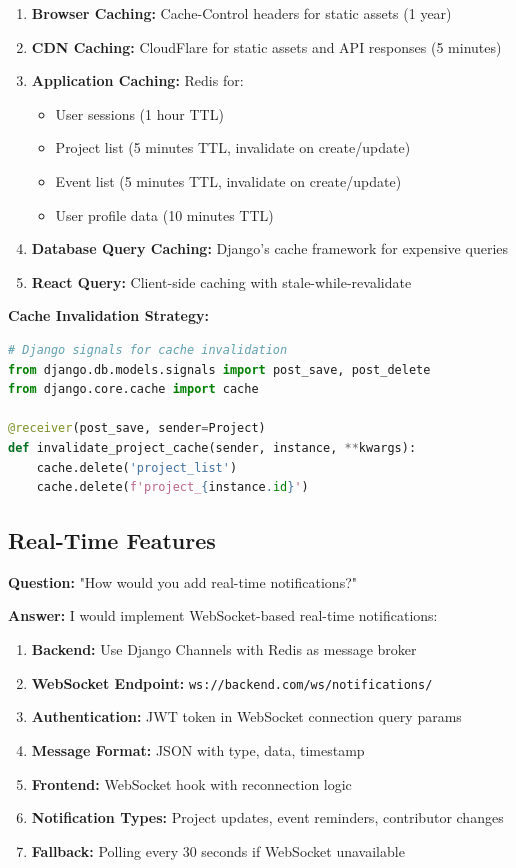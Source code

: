 \documentclass[11pt,a4paper]{article}
\begin{document}
\begin{enumerate}[leftmargin=*]
    \item \textbf{Browser Caching:} Cache-Control headers for static assets (1 year)
    \item \textbf{CDN Caching:} CloudFlare for static assets and API responses (5 minutes)
    \item \textbf{Application Caching:} Redis for:
    \begin{itemize}
        \item User sessions (1 hour TTL)
        \item Project list (5 minutes TTL, invalidate on create/update)
        \item Event list (5 minutes TTL, invalidate on create/update)
        \item User profile data (10 minutes TTL)
    \end{itemize}
    \item \textbf{Database Query Caching:} Django's cache framework for expensive queries
    \item \textbf{React Query:} Client-side caching with stale-while-revalidate
\end{enumerate}

\textbf{Cache Invalidation Strategy:}
\begin{lstlisting}[language=Python]
# Django signals for cache invalidation
from django.db.models.signals import post_save, post_delete
from django.core.cache import cache

@receiver(post_save, sender=Project)
def invalidate_project_cache(sender, instance, **kwargs):
    cache.delete('project_list')
    cache.delete(f'project_{instance.id}')
\end{lstlisting}

\subsection{Real-Time Features}
\textbf{Question:} "How would you add real-time notifications?"

\textbf{Answer:} I would implement WebSocket-based real-time notifications:

\begin{enumerate}[leftmargin=*]
    \item \textbf{Backend:} Use Django Channels with Redis as message broker
    \item \textbf{WebSocket Endpoint:} \texttt{ws://backend.com/ws/notifications/}
    \item \textbf{Authentication:} JWT token in WebSocket connection query params
    \item \textbf{Message Format:} JSON with type, data, timestamp
    \item \textbf{Frontend:} WebSocket hook with reconnection logic
    \item \textbf{Notification Types:} Project updates, event reminders, contributor changes
    \item \textbf{Fallback:} Polling every 30 seconds if WebSocket unavailable
\end{enumerate}
\end{document}
